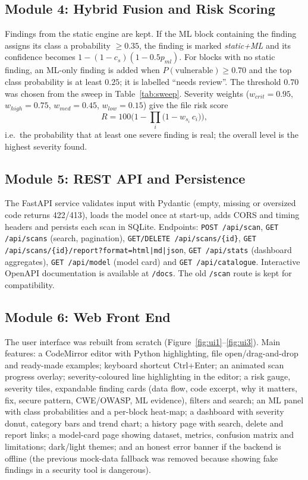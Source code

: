 \documentclass[11pt,a4paper,twoside]{report}
\begin{document}
\subsection{Module 4: Hybrid Fusion and Risk Scoring}
Findings from the static engine are kept. If the ML block containing the finding assigns its class a probability $\ge0.35$, the finding is marked \emph{static+ML} and its confidence becomes $1-(1-c_s)(1-0.5p_{ml})$. For blocks with no static finding, an ML-only finding is added when $P(\text{vulnerable})\ge 0.70$ and the top class probability is at least $0.25$; it is labelled ``needs review''. The threshold $0.70$ was chosen from the sweep in Table~\ref{tab:sweep}. Severity weights ($w_{crit}=0.95$, $w_{high}=0.75$, $w_{med}=0.45$, $w_{low}=0.15$) give the file risk score
\[
R = 100\Big(1-\prod_i \big(1-w_{s_i}\,c_i\big)\Big),
\]
i.e.\ the probability that at least one severe finding is real; the overall level is the highest severity found.

\subsection{Module 5: REST API and Persistence}
The FastAPI service validates input with Pydantic (empty, missing or oversized code returns 422/413), loads the model once at start-up, adds CORS and timing headers and persists each scan in SQLite. Endpoints: \texttt{POST /api/scan}, \texttt{GET /api/scans} (search, pagination), \texttt{GET/DELETE /api/scans/\{id\}}, \texttt{GET /api/scans/\{id\}/report?format=html|md|json}, \texttt{GET /api/stats} (dashboard aggregates), \texttt{GET /api/model} (model card) and \texttt{GET /api/catalogue}. Interactive OpenAPI documentation is available at \texttt{/docs}. The old \texttt{/scan} route is kept for compatibility.

\subsection{Module 6: Web Front End}
The user interface was rebuilt from scratch (Figure~\ref{fig:ui1}--\ref{fig:ui3}). Main features: a CodeMirror editor with Python highlighting, file open/drag-and-drop and ready-made examples; keyboard shortcut Ctrl+Enter; an animated scan progress overlay; severity-coloured line highlighting in the editor; a risk gauge, severity tiles, expandable finding cards (data flow, code excerpt, why it matters, fix, secure pattern, CWE/OWASP, ML evidence), filters and search; an ML panel with class probabilities and a per-block heat-map; a dashboard with severity donut, category bars and trend chart; a history page with search, delete and report links; a model-card page showing dataset, metrics, confusion matrix and limitations; dark/light themes; and an honest error banner if the backend is offline (the previous mock-data fallback was removed because showing fake findings in a security tool is dangerous).
\end{document}
